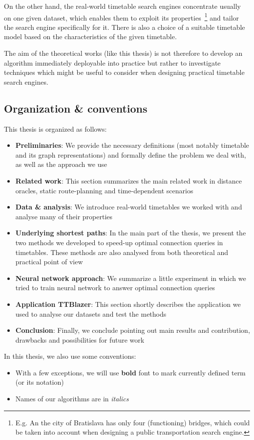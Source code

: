 	On the other hand, the real-world timetable search engines concentrate usually on one given dataset, which enables them to exploit its properties~\footnote{E.g. An the city of Bratislava has only four (functioning) bridges, which could be taken into account when designing a public transportation search engine.} and tailor the search engine specifically for it. There is also a choice of a suitable timetable model based on the characteristics of the given timetable.
	
	The aim of the theoretical works (like this thesis) is not therefore to develop an algorithm immediately deployable into practice but rather to investigate techniques which might be useful to consider when designing practical timetable search engines.
	
\subsection{Organization \& conventions}

	\noindent This thesis is organized as follows: 
	\begin{itemize}
		\item \textbf{Preliminaries}: We provide the necessary definitions (most notably timetable and its graph representations) and formally define the problem we deal with, as well as the approach we use
		\item \textbf{Related work}: This section summarizes the main related work in distance oracles, static route-planning and time-dependent scenarios
		\item \textbf{Data \& analysis}: We introduce real-world timetables we worked with and analyse many of their properties
		\item \textbf{Underlying shortest paths}: In the main part of the thesis, we present the two methods we developed to speed-up optimal connection queries in timetables. These methods are also analysed from both theoretical and practical point of view
		\item \textbf{Neural network approach}: We summarize a little experiment in which we tried to train neural network to answer optimal connection queries
		\item \textbf{Application TTBlazer}: This section shortly describes the application we used to analyse our datasets and test the methods
		\item \textbf{Conclusion}: Finally, we conclude pointing out main results and contribution, drawbacks and possibilities for future work
	\end{itemize}
	\hspace{\fill}
	
	\noindent In this thesis, we also use some conventions:
	\begin{itemize}
		\item With a few exceptions, we will use \textbf{bold} font to mark currently defined term (or its notation)
		\item Names of our algorithms are in \textit{italics}
	\end{itemize}
	